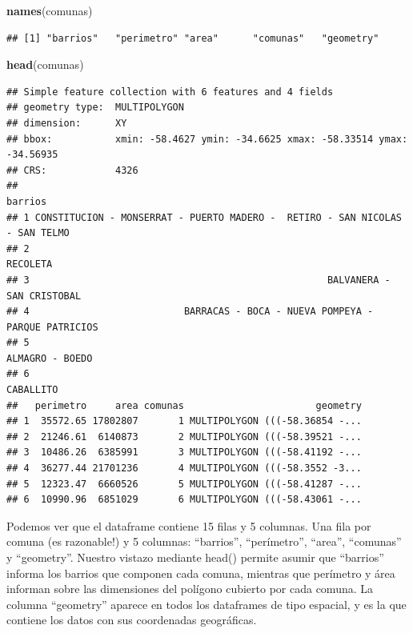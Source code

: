 \documentclass[spanish,]{book}
\newenvironment{Shaded}{\begin{snugshade}}{\end{snugshade}}
\newcommand{\KeywordTok}[1]{\textcolor[rgb]{0.13,0.29,0.53}{\textbf{#1}}}
\newcommand{\NormalTok}[1]{#1}
\begin{document}
\begin{Shaded}
\begin{Highlighting}[]
\KeywordTok{names}\NormalTok{(comunas)}
\end{Highlighting}
\end{Shaded}

\begin{verbatim}
## [1] "barrios"   "perimetro" "area"      "comunas"   "geometry"
\end{verbatim}

\begin{Shaded}
\begin{Highlighting}[]
\KeywordTok{head}\NormalTok{(comunas)}
\end{Highlighting}
\end{Shaded}

\begin{verbatim}
## Simple feature collection with 6 features and 4 fields
## geometry type:  MULTIPOLYGON
## dimension:      XY
## bbox:           xmin: -58.4627 ymin: -34.6625 xmax: -58.33514 ymax: -34.56935
## CRS:            4326
##                                                                        barrios
## 1 CONSTITUCION - MONSERRAT - PUERTO MADERO -  RETIRO - SAN NICOLAS - SAN TELMO
## 2                                                                     RECOLETA
## 3                                                    BALVANERA - SAN CRISTOBAL
## 4                           BARRACAS - BOCA - NUEVA POMPEYA - PARQUE PATRICIOS
## 5                                                              ALMAGRO - BOEDO
## 6                                                                    CABALLITO
##   perimetro     area comunas                       geometry
## 1  35572.65 17802807       1 MULTIPOLYGON (((-58.36854 -...
## 2  21246.61  6140873       2 MULTIPOLYGON (((-58.39521 -...
## 3  10486.26  6385991       3 MULTIPOLYGON (((-58.41192 -...
## 4  36277.44 21701236       4 MULTIPOLYGON (((-58.3552 -3...
## 5  12323.47  6660526       5 MULTIPOLYGON (((-58.41287 -...
## 6  10990.96  6851029       6 MULTIPOLYGON (((-58.43061 -...
\end{verbatim}

Podemos ver que el dataframe contiene 15 filas y 5 columnas. Una fila por comuna (es razonable!) y 5 columnas: ``barrios'', ``perímetro'', ``area'', ``comunas'' y ``geometry''. Nuestro vistazo mediante head() permite asumir que ``barrios'' informa los barrios que componen cada comuna, mientras que perímetro y área informan sobre las dimensiones del polígono cubierto por cada comuna. La columna ``geometry'' aparece en todos los dataframes de tipo espacial, y es la que contiene los datos con sus coordenadas geográficas.
\end{document}
